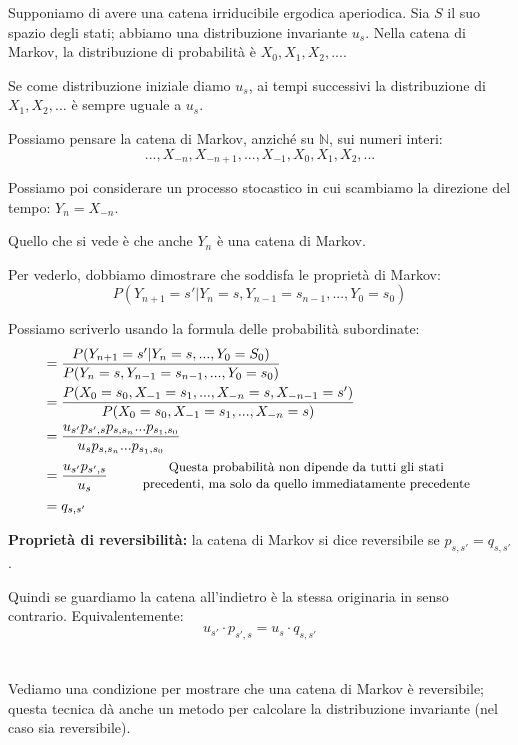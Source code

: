\documentclass[a4paper,12pt]{book}
\begin{document}
Supponiamo di avere una catena irriducibile ergodica aperiodica. Sia $ S $ il suo spazio degli stati; abbiamo una distribuzione invariante $ u_s $. Nella catena di Markov, la distribuzione di probabilità è $ X_0, X_1, X_2, ... $.

Se come distribuzione iniziale diamo $ u_s $, ai tempi successivi la distribuzione di $ X_1, X_2, ... $ è sempre uguale a $ u_s $.

Possiamo pensare la catena di Markov, anziché su $ \mathbb{N} $, sui numeri interi:
$$  ..., X_{-n}, X_{-n+1}, ..., X_{-1}, X_0, X_1, X_2, ... $$

Possiamo poi considerare un processo stocastico in cui scambiamo la direzione del tempo: $ Y_n = X_{-n} $.

Quello che si vede è che anche $ Y_n $ è una catena di Markov. 

Per vederlo, dobbiamo dimostrare che soddisfa le proprietà di Markov:
$$ P (Y_{n+1} = s' | Y_{n} = s, Y_{n-1} = s_{n-1}, ..., Y_0 = s_0) $$ 

Possiamo scriverlo usando la formula delle probabilità subordinate:
\begin{align*}
	& = \frac{P(Y_{n+1} = s' | Y_n = s, ..., Y_0 = S_0)}{P(Y_n = s, Y_{n-1} = s_{n-1}, ..., Y_0 = s_0)} \\ 
	& = \frac{P(X_0=s_0, X_{-1} = s_1, ..., X_{-n} = s, X_{-n-1} = s')}{P(X_0 = s_0, X_{-1} = s_1, ..., X_{-n} = s)} \\
	& = \frac{u_{s'}p_{s',s} p_{s,s_n}...p_{s_1, s_0}}{u_s p_{s,s_n}...p_{s_1, s_0}} \\
	& = \frac{u_{s'} p_{s',s}}{u_s} \qquad \begin{array}{c}
		\text{\small Questa probabilità non dipende da tutti gli stati} \\ 
		\text{\small precedenti, ma solo da quello immediatamente precedente} 
	\end{array} \\
	& = q_{s,s'}
\end{align*}

\textbf{Proprietà di reversibilità:} 
 la catena di Markov si dice reversibile se $ p_{s,s'} = q_{s,s'} $. 

Quindi se guardiamo la catena all'indietro è la stessa originaria in senso contrario. Equivalentemente:
$$ u_{s'} \cdot p_{s',s} = u_s \cdot q_{s,s'} $$
\\
\\
Vediamo una condizione per mostrare che una catena di Markov è reversibile; questa tecnica dà anche un metodo per calcolare la distribuzione invariante (nel caso sia reversibile). 
\end{document}
